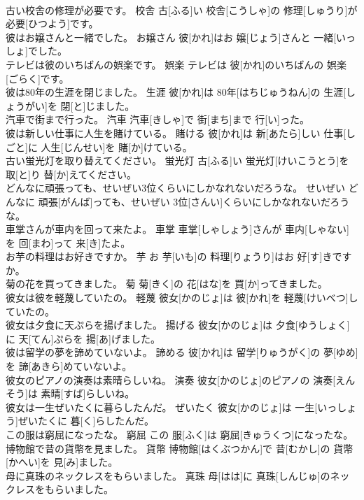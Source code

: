 \documentclass[8pt]{extreport}
\begin{document}
\begin{CJK}{UTF8}{min}
\\	古い校舎の修理が必要です。	校舎	古[ふる]い 校舎[こうしゃ]の 修理[しゅうり]が 必要[ひつよう]です。	
\\	彼はお嬢さんと一緒でした。	お嬢さん	彼[かれ]はお 嬢[じょう]さんと 一緒[いっしょ]でした。	
\\	テレビは彼のいちばんの娯楽です。	娯楽	テレビは 彼[かれ]のいちばんの 娯楽[ごらく]です。	
\\	彼は80年の生涯を閉じました。	生涯	彼[かれ]は 80年[はちじゅうねん]の 生涯[しょうがい]を 閉[と]じました。	
\\	汽車で街まで行った。	汽車	汽車[きしゃ]で 街[まち]まで 行[い]った。	
\\	彼は新しい仕事に人生を賭けている。	賭ける	彼[かれ]は 新[あたら]しい 仕事[しごと]に 人生[じんせい]を 賭[か]けている。	
\\	古い蛍光灯を取り替えてください。	蛍光灯	古[ふる]い 蛍光灯[けいこうとう]を 取[と]り 替[か]えてください。	
\\	どんなに頑張っても、せいぜい3位くらいにしかなれないだろうな。	せいぜい	どんなに 頑張[がんば]っても、せいぜい 3位[さんい]くらいにしかなれないだろうな。	
\\	車掌さんが車内を回って来たよ。	車掌	車掌[しゃしょう]さんが 車内[しゃない]を 回[まわ]って 来[き]たよ。	
\\	お芋の料理はお好きですか。	芋	お 芋[いも]の 料理[りょうり]はお 好[す]きですか。	
\\	菊の花を買ってきました。	菊	菊[きく]の 花[はな]を 買[か]ってきました。	
\\	彼女は彼を軽蔑していたの。	軽蔑	彼女[かのじょ]は 彼[かれ]を 軽蔑[けいべつ]していたの。	
\\	彼女は夕食に天ぷらを揚げました。	揚げる	彼女[かのじょ]は 夕食[ゆうしょく]に 天[てん]ぷらを 揚[あ]げました。	
\\	彼は留学の夢を諦めていないよ。	諦める	彼[かれ]は 留学[りゅうがく]の 夢[ゆめ]を 諦[あきら]めていないよ。	
\\	彼女のピアノの演奏は素晴らしいね。	演奏	彼女[かのじょ]のピアノの 演奏[えんそう]は 素晴[すば]らしいね。	
\\	彼女は一生ぜいたくに暮らしたんだ。	ぜいたく	彼女[かのじょ]は 一生[いっしょう]ぜいたくに 暮[く]らしたんだ。	
\\	この服は窮屈になったな。	窮屈	この 服[ふく]は 窮屈[きゅうくつ]になったな。	
\\	博物館で昔の貨幣を見ました。	貨幣	博物館[はくぶつかん]で 昔[むかし]の 貨幣[かへい]を 見[み]ました。	
\\	母に真珠のネックレスをもらいました。	真珠	母[はは]に 真珠[しんじゅ]のネックレスをもらいました。	

\end{CJK}
\end{document}
